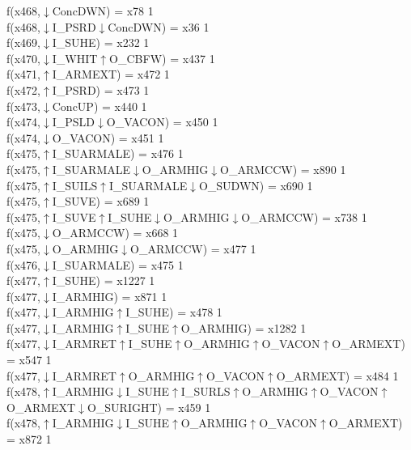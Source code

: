 f(x468,$\downarrow$ConcDWN) = x78 {1} \\
f(x468,$\downarrow$I\_PSRD$\downarrow$ConcDWN) = x36 {1} \\
f(x469,$\downarrow$I\_SUHE) = x232 {1} \\
f(x470,$\downarrow$I\_WHIT$\uparrow$O\_CBFW) = x437 {1} \\
f(x471,$\uparrow$I\_ARMEXT) = x472 {1} \\
f(x472,$\uparrow$I\_PSRD) = x473 {1} \\
f(x473,$\downarrow$ConcUP) = x440 {1} \\
f(x474,$\downarrow$I\_PSLD$\downarrow$O\_VACON) = x450 {1} \\
f(x474,$\downarrow$O\_VACON) = x451 {1} \\
f(x475,$\uparrow$I\_SUARMALE) = x476 {1} \\
f(x475,$\uparrow$I\_SUARMALE$\downarrow$O\_ARMHIG$\downarrow$O\_ARMCCW) = x890 {1} \\
f(x475,$\uparrow$I\_SUILS$\uparrow$I\_SUARMALE$\downarrow$O\_SUDWN) = x690 {1} \\
f(x475,$\uparrow$I\_SUVE) = x689 {1} \\
f(x475,$\uparrow$I\_SUVE$\uparrow$I\_SUHE$\downarrow$O\_ARMHIG$\downarrow$O\_ARMCCW) = x738 {1} \\
f(x475,$\downarrow$O\_ARMCCW) = x668 {1} \\
f(x475,$\downarrow$O\_ARMHIG$\downarrow$O\_ARMCCW) = x477 {1} \\
f(x476,$\downarrow$I\_SUARMALE) = x475 {1} \\
f(x477,$\uparrow$I\_SUHE) = x1227 {1} \\
f(x477,$\downarrow$I\_ARMHIG) = x871 {1} \\
f(x477,$\downarrow$I\_ARMHIG$\uparrow$I\_SUHE) = x478 {1} \\
f(x477,$\downarrow$I\_ARMHIG$\uparrow$I\_SUHE$\uparrow$O\_ARMHIG) = x1282 {1} \\
f(x477,$\downarrow$I\_ARMRET$\uparrow$I\_SUHE$\uparrow$O\_ARMHIG$\uparrow$O\_VACON$\uparrow$O\_ARMEXT) = x547 {1} \\
f(x477,$\downarrow$I\_ARMRET$\uparrow$O\_ARMHIG$\uparrow$O\_VACON$\uparrow$O\_ARMEXT) = x484 {1} \\
f(x478,$\uparrow$I\_ARMHIG$\downarrow$I\_SUHE$\uparrow$I\_SURLS$\uparrow$O\_ARMHIG$\uparrow$O\_VACON$\uparrow$O\_ARMEXT$\downarrow$O\_SURIGHT) = x459 {1} \\
f(x478,$\uparrow$I\_ARMHIG$\downarrow$I\_SUHE$\uparrow$O\_ARMHIG$\uparrow$O\_VACON$\uparrow$O\_ARMEXT) = x872 {1} \\

